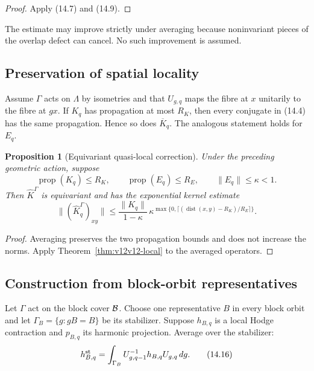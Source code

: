 \documentclass[11pt]{article}
\newtheorem{proposition}[theorem]{Proposition}
\theoremstyle{remark}
\begin{document}
\begin{proof}
Apply (14.7) and (14.9).
\end{proof}

The estimate may improve strictly under averaging because
noninvariant pieces of the overlap defect can cancel.  No such
improvement is assumed.

\subsection{Preservation of spatial locality}

Assume \(\Gamma\) acts on \(\Lambda\) by isometries and that
\(U_{g,q}\) maps the fibre at \(x\) unitarily to the fibre at \(gx\).
If \(K_q\) has propagation at most \(R_K\), then every conjugate in
(14.4) has the same propagation.  Hence so does \(\overline K_q\).
The analogous statement holds for \(E_q\).

\begin{proposition}[Equivariant quasi-local correction]
\label{prop:v12v14-local}
Under the preceding geometric action, suppose
\[
 \operatorname{prop}(K_q)\le R_K,\qquad
 \operatorname{prop}(E_q)\le R_E,\qquad
 \|E_q\|\le\kappa<1.                                      \tag{14.14}
\]
Then \(\widehat K^\Gamma\) is equivariant and has the exponential
kernel estimate
\[
 \|(\widehat K_q^\Gamma)_{xy}\|
 \le
 \frac{\|K_q\|}{1-\kappa}\,
 \kappa^{\max\{0,\lceil
   (\operatorname{dist}(x,y)-R_K)/R_E\rceil\}}.             \tag{14.15}
\]
\end{proposition}

\begin{proof}
Averaging preserves the two propagation bounds and does not increase
the norms.  Apply Theorem~\ref{thm:v12v12-local} to the averaged
operators.
\end{proof}

\subsection{Construction from block-orbit representatives}

Let \(\Gamma\) act on the block cover \({\cal B}\).  Choose one
representative \(B\) in every block orbit and let
\(\Gamma_B=\{g:gB=B\}\) be its stabilizer.  Suppose \(h_{B,q}\) is a
local Hodge contraction and \(p_{B,q}\) its harmonic projection.
Average over the stabilizer:
\[
 h_{B,q}^{\rm st}
 =
 \int_{\Gamma_B}
 U_{g,q-1}^{-1}h_{B,q}U_{g,q}\,dg.                         \tag{14.16}
\]
\end{document}
